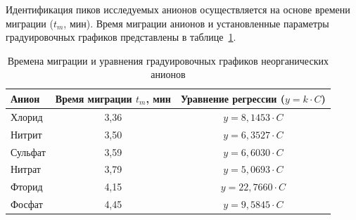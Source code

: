 Идентификация пиков исследуемых анионов осуществляется на основе времени миграции ($t_m$, мин). Время миграции анионов и установленные параметры градуировочных графиков представлены в таблице~\ref{tab:migration_params}.

\begin{table}[H]
\centering
\caption{Времена миграции и уравнения градуировочных графиков неорганических анионов}
\label{tab:migration_params}
\begin{tabular}{|l|c|c|}
\hline
Анион & Время миграции $t_m$, мин & Уравнение регрессии ($y = k \cdot C$) \\ \hline
Хлорид         & 3,36                      & $y = 8,1453 \cdot C$                                \\ \hline
Нитрит         & 3,50                      & $y = 6,3527 \cdot C$                                \\ \hline
Сульфат        & 3,59                      & $y = 6,6030 \cdot C$                                \\ \hline
Нитрат         & 3,79                      & $y = 5,0693 \cdot C$                                \\ \hline
Фторид         & 4,15                      & $y = 22,7660 \cdot C$                                \\ \hline
Фосфат         & 4,45                      & $y = 9,5845 \cdot C$                                \\ \hline
\end{tabular}
\end{table}
